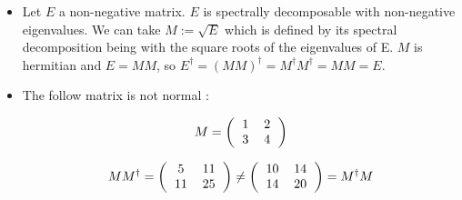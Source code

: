 \begin{itemize}
  \item Let $E$ a non-negative matrix. $E$ is spectrally decomposable with
    non-negative eigenvalues. We can take $M :=\sqrt E$ which is defined by its spectral decomposition being with the square roots
    of the eigenvalues of E. $M$ is hermitian and $E = MM$, so $E^\dagger =
    (MM)^\dagger = M^\dagger M^\dagger = MM = E$.

  \item The follow matrix is not normal :

    \[M=
      \left(\begin{tabular}{c c}
        1 & 2 \\
        3 & 4
      \end{tabular}\right)
    \]

    \[MM^\dagger = \left(\begin{tabular}{c c}
        5  & 11 \\
        11 & 25
      \end{tabular}\right) \not = 
      \left(\begin{tabular}{c c}
        10 & 14 \\
        14 & 20
      \end{tabular}\right) = M^\dagger M\]

\end{itemize}

~

